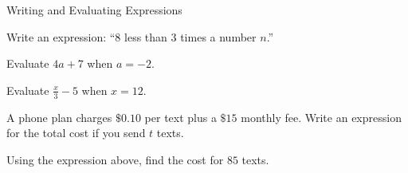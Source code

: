 \begin{practiceBox}{Writing and Evaluating Expressions}
\resetProblems

\prob Write an expression: ``$8$ less than $3$ times a number $n$.''

\prob Evaluate $4a + 7$ when $a = -2$.

\prob Evaluate $\frac{x}{3} - 5$ when $x = 12$.

\prob A phone plan charges $\$0.10$ per text plus a $\$15$ monthly fee. Write an expression for the total cost if you send $t$ texts.

\prob Using the expression above, find the cost for $85$ texts.

\end{practiceBox}
